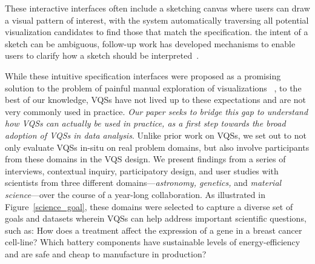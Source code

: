  These interactive interfaces often include a sketching canvas where users can draw a visual pattern of interest, with the system automatically traversing all potential visualization candidates to find those that match the specification.  the intent of a sketch can be ambiguous, follow-up work has developed mechanisms to enable users to clarify how a sketch should be interpreted~\cite{ryall2005querylines,correll2016semantics,Mannino2018,Eichmann2015,Holz2009}.
 \par While these intuitive specification interfaces were proposed as a promising solution to the problem of painful manual exploration of visualizations ~\cite{ryall2005querylines,wattenberg2001sketching}, to the best of our knowledge, VQSs have not lived up to these expectations and are not very commonly used in practice.
 {\em Our paper seeks to bridge this gap
 to understand how VQSs can actually be used in practice,
 as a first step towards the broad adoption of VQSs in data analysis}.
 Unlike prior work on VQSs,
 we set out to not only evaluate VQSs in-situ on
 real problem domains, but also involve participants
 from these domains in the VQS design. We present findings from a series of interviews, contextual inquiry, participatory design, and user studies with scientists from three different domains---{\em astronomy, genetics,} and {\em material science}---over the course of
 a year-long collaboration.  As illustrated in Figure~\ref{science_goal}, these domains were selected to capture a diverse set of goals and datasets wherein VQSs can help address important scientific questions, such as: How does a treatment affect the expression of a gene in a breast cancer cell-line? Which battery components have sustainable levels of energy-efficiency and are safe and
 cheap to manufacture in production?
